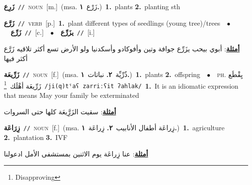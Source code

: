 \documentclass[10pt,a4paper,twoside]{article} %
\begin{document}
\begin{multicols}{2}
{\setlength\topsep{0pt}\textbf{\foreignlanguage{arabic}{زَرِع}}\ {\color{gray}\texttt{//}\color{black}}\ \textsc{noun}\ [m.]\ \color{gray}(msa. \foreignlanguage{arabic}{زَرْع}~\foreignlanguage{arabic}{\textbf{١.}})\color{black}\ \textbf{1.}~plants  \textbf{2.}~planting sth\ } \vspace{2mm}

{\setlength\topsep{0pt}\textbf{\foreignlanguage{arabic}{زَرَّع}}\ {\color{gray}\texttt{//}\color{black}}\ \textsc{verb}\ [p.]\ \textbf{1.}~plant different types of seedlings (young tree)/trees\ \ $\bullet$\ \ \setlength\topsep{0pt}\textbf{\foreignlanguage{arabic}{زَرِّع}}\ {\color{gray}\texttt{//}\color{black}}\ [c.]\ \ $\bullet$\ \ \setlength\topsep{0pt}\textbf{\foreignlanguage{arabic}{يزَرِّع}}\ {\color{gray}\texttt{//}\color{black}}\ [i.]\  \begin{flushright}\color{gray}\foreignlanguage{arabic}{\textbf{\underline{\foreignlanguage{arabic}{أمثلة}}}: أبوي بيحب يزَرِّع جوافة وتين وأفوكادو وأسكدنيا ولو الأرض تسع أكثر تلاقيه زَرَّع أكثر فيها}\end{flushright}\color{black}} \vspace{2mm}

{\setlength\topsep{0pt}\textbf{\foreignlanguage{arabic}{زَرِّيعَة}}\ {\color{gray}\texttt{//}\color{black}}\ \textsc{noun}\ [f.]\ \color{gray}(msa. \foreignlanguage{arabic}{ذُرِّيِّة}~\foreignlanguage{arabic}{\textbf{٢.}}  \foreignlanguage{arabic}{نباتات}~\foreignlanguage{arabic}{\textbf{١.}})\color{black}\ \textbf{1.}~plants  \textbf{2.}~offspring\ \ $\bullet$\ \ \textsc{ph.} \color{gray} \foreignlanguage{arabic}{يِقْطَع زَرِّيعَة أهْلَك}\color{black}\ \footnote{Disapproving}\ {\color{gray}\texttt{/{\sffamily ji(q)tˤaʕ zarriːʕit ʔahlak}/}\color{black}}\ \textbf{1.}~It is an idiomatic expression that means May your  family be exterminated\  \begin{flushright}\color{gray}\foreignlanguage{arabic}{\textbf{\underline{\foreignlanguage{arabic}{أمثلة}}}: سقيت الزَرَِّيعَة كلها حتى السروات}\end{flushright}\color{black}} \vspace{2mm}

{\setlength\topsep{0pt}\textbf{\foreignlanguage{arabic}{زِرَاعَة}}\ {\color{gray}\texttt{//}\color{black}}\ \textsc{noun}\ [f.]\ \color{gray}(msa. \foreignlanguage{arabic}{زِراعَة أطفال الأنابيب}~\foreignlanguage{arabic}{\textbf{٢.}}  \foreignlanguage{arabic}{زِراعَة}~\foreignlanguage{arabic}{\textbf{١.}})\color{black}\ \textbf{1.}~agriculture  \textbf{2.}~plantation  \textbf{3.}~IVF\  \begin{flushright}\color{gray}\foreignlanguage{arabic}{\textbf{\underline{\foreignlanguage{arabic}{أمثلة}}}: عنا زِراعَة يوم الاثنين بمستشفى الأمل ادعولنا}\end{flushright}\color{black}} \vspace{2mm}


\end{multicols}
\end{document}
